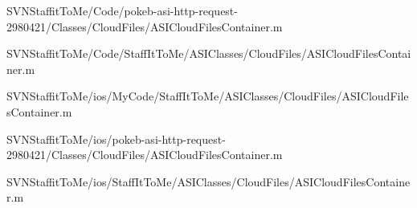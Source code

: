 \begin{DoxyCompactItemize}
\-S\-V\-N\-Staffit\-To\-Me/\-Code/pokeb-\/asi-\/http-\/request-\/2980421/\-Classes/\-Cloud\-Files/\-A\-S\-I\-Cloud\-Files\-Container.\-m\item 
\-S\-V\-N\-Staffit\-To\-Me/\-Code/\-Staff\-It\-To\-Me/\-A\-S\-I\-Classes/\-Cloud\-Files/\-A\-S\-I\-Cloud\-Files\-Container.\-m\item 
\-S\-V\-N\-Staffit\-To\-Me/ios/\-My\-Code/\-Staff\-It\-To\-Me/\-A\-S\-I\-Classes/\-Cloud\-Files/\-A\-S\-I\-Cloud\-Files\-Container.\-m\item 
\-S\-V\-N\-Staffit\-To\-Me/ios/pokeb-\/asi-\/http-\/request-\/2980421/\-Classes/\-Cloud\-Files/\-A\-S\-I\-Cloud\-Files\-Container.\-m\item 
\-S\-V\-N\-Staffit\-To\-Me/ios/\-Staff\-It\-To\-Me/\-A\-S\-I\-Classes/\-Cloud\-Files/\-A\-S\-I\-Cloud\-Files\-Container.\-m\end{DoxyCompactItemize}
